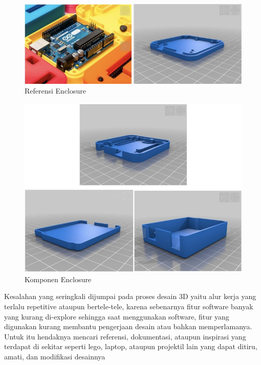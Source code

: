     \begin{figure}[H]
        \centering
        \includegraphics[width=1\linewidth]{P3/img/image1.jpg}
        \caption{Referensi Enclosure}
        \label{fig:Referensi Enclosure}
    \end{figure}

    \begin{figure}[H]
        \centering
        \includegraphics[width=1\linewidth]{P3/img/image2.jpg}
        \caption{Komponen Enclosure}
        \label{fig:Komponen Enclosure}
    \end{figure}

Kesalahan yang seringkali dijumpai pada proses desain 3D yaitu alur kerja yang terlalu repetitive ataupun
bertele-tele, karena sebenarnya fitur software banyak yang kurang di-explore sehingga saat
menggunakan software, fitur yang digunakan kurang membantu pengerjaan desain atau bahkan
memperlamanya. Untuk itu hendaknya mencari referensi, dokumentasi, ataupun inspirasi yang terdapat
di sekitar seperti lego, laptop, ataupun projektil lain yang dapat ditiru, amati, dan modifikasi desainnya

